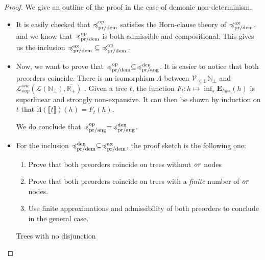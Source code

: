 \begin{proof}
    We give an outline of the proof in the case of demonic non-determinism.

    \begin{itemize}
        \item 
    It is easily checked that $\preccurlyeq^{\text{op}}_{\text{pr/dem}}$ satisfies the Horn-clause
    theory of $\preccurlyeq^{\text{ax}}_{\text{pr/dem}}$, and we know that $\preccurlyeq^{\text{op}}_{\text{pr/dem}}$ is 
    both admissible and compositional. This gives us the inclusion 
    ${\preccurlyeq^{\text{ax}}_{\text{pr/dem}}} \subseteq {\preccurlyeq^{\text{op}}_{\text{pr/dem}}}\,$.

        \item 
    Now, we want to prove that $\preccurlyeq^{\text{op}}_{\text{pr/dem}} \subseteq
    \preccurlyeq^{\text{den}}_{\text{pr/ang}}$. It is easier to notice that both preorders coincide.
    There is an isomorphism $\Lambda$ between $\mathcal{V}_{\leq 1} \,\mathbb{N}_\bot$
    and $\mathcal{L}_{sup}^{sne} (\mathcal{L} (\mathbb{N}_\bot),
    \overline{\mathbb{R}_+})$ \cite{KeimelP2016}. Given a tree $t$, the function  
    $F_t : h \mapsto \inf_s \mathbf{E}_{t \# s} (h)$ is superlinear and 
    strongly non-expansive. It can then be shown by induction on $t$ that 
    $\Lambda (\llbracket t \rrbracket) (h) = F_t (h)$.

    We do conclude that $\preccurlyeq^{\text{op}}_{\text{pr/ang}} = \preccurlyeq^{\text{den}}_{\text{pr/ang}}$.

    \item 
        For the inclusion $\preccurlyeq^{\text{den}}_{\text{pr/dem}} \subseteq
        \preccurlyeq^{\text{ax}}_{\text{pr/dem}}$, the proof sketch is the following one:

    \begin{enumerate}
        \item Prove that both preorders coincide 
            on trees without $\operatorname{\mathit{or}}$ nodes
        \item Prove that both preorders coincide 
            on trees with a \emph{finite} number 
            of $\operatorname{\mathit{or}}$ nodes.
        \item Use finite approximations and admissibility
            of both preorders to conclude in the general case.
    \end{enumerate}

    \begin{description}
        \item[Trees with no disjunction]


\end{description}
\end{itemize}
\end{proof}
